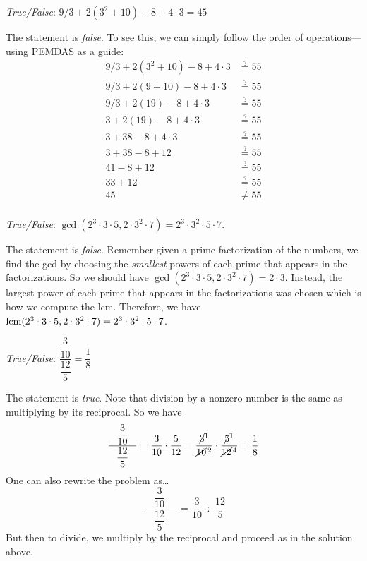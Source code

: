 \documentclass[11pt,letterpaper]{article}
\begin{document}
\thispagestyle{title}

\quizsol \textit{True/False}: $9/3 + 2(3^2 + 10) - 8 + 4 \cdot 3= 45$ \pspace

\sol The statement is \textit{false}. To see this, we can simply follow the order of operations---using PEMDAS as a guide:
	\[
	\begin{aligned}
	9/3 + 2(3^2 + 10) - 8 + 4 \cdot 3&\stackrel{?}{=} 55 \\
	9/3 + 2(9 + 10) - 8 + 4 \cdot 3&\stackrel{?}{=} 55 \\
	9/3 + 2(19) - 8 + 4 \cdot 3&\stackrel{?}{=} 55 \\
	3 + 2(19) - 8 + 4 \cdot 3&\stackrel{?}{=} 55 \\ 
	3 + 38 - 8 + 4 \cdot 3&\stackrel{?}{=} 55 \\ 
	3 + 38 - 8 + 12&\stackrel{?}{=} 55 \\ 
	41 - 8 + 12&\stackrel{?}{=} 55 \\
	33 + 12&\stackrel{?}{=} 55 \\
	45&\neq 55 \\
	\end{aligned}
	\] \pvspace{1.5cm}



\quizsol \textit{True/False}: $\gcd(2^3 \cdot 3 \cdot 5, 2 \cdot 3^2 \cdot 7)= 2^3 \cdot 3^2 \cdot 5 \cdot 7$. \pspace

\sol The statement is \textit{false}. Remember given a prime factorization of the numbers, we find the gcd by choosing the \textit{smallest} powers of each prime that appears in the factorizations. So we should have $\gcd(2^3 \cdot 3 \cdot 5, 2 \cdot 3^2 \cdot 7)= 2 \cdot 3$. Instead, the largest power of each prime that appears in the factorizations was chosen which is how we compute the lcm. Therefore, we have $\operatorname{lcm}(2^3 \cdot 3 \cdot 5, 2 \cdot 3^2 \cdot 7)= 2^3 \cdot 3^2 \cdot 5 \cdot 7$. \pvspace{1.2cm}



\quizsol \textit{True/False}: $\dfrac{\dfrac{3}{10}}{\dfrac{12}{5}}= \dfrac{1}{8}$ \pspace

\sol The statement is \textit{true}. Note that division by a nonzero number is the same as multiplying by its reciprocal. So we have
	\[
	\dfrac{\phantom{-}\dfrac{3}{10}\phantom{-}}{\dfrac{12}{5}}= \dfrac{3}{10} \cdot \dfrac{5}{12}= \dfrac{\cancel{3}^1}{\cancel{10}^{\,2}} \cdot \dfrac{\cancel{5}^1}{\cancel{12}^{\,4}}= \dfrac{1}{8}
	\]
One can also rewrite the problem as\dots 
	\[
	\dfrac{\phantom{-}\dfrac{3}{10}\phantom{-}}{\dfrac{12}{5}}= \dfrac{3}{10} \div \dfrac{12}{5}
	\]
But then to divide, we multiply by the reciprocal and proceed as in the solution above. \pvspace{1.5cm}
\end{document}
